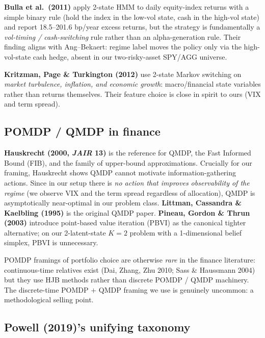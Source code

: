 \documentclass[11pt]{article}
\theoremstyle{plain1}
\theoremstyle{definition1}
\newcommand{\1}{\mathbf{1}}
\begin{document}
\textbf{Bulla et al.\ (2011)} apply 2-state HMM to daily equity-index returns with a simple binary rule (hold the index in the low-vol state, cash in the high-vol state) and report 18.5--201.6 bp/year excess returns, but the strategy is fundamentally a \emph{vol-timing / cash-switching} rule rather than an alpha-generation rule. Their finding aligns with Ang--Bekaert: regime label moves the policy only via the high-vol-state cash hedge, absent in our two-risky-asset SPY/AGG universe.

\textbf{Kritzman, Page \& Turkington (2012)} use 2-state Markov switching on \emph{market turbulence, inflation, and economic growth}: macro/financial state variables rather than returns themselves. Their feature choice is close in spirit to ours (VIX and term spread).

\subsection{POMDP / QMDP in finance}

\textbf{Hauskrecht (2000, \emph{JAIR} 13)} is the reference for QMDP, the Fast Informed Bound (FIB), and the family of upper-bound approximations. Crucially for our framing, Hauskrecht shows QMDP cannot motivate information-gathering actions. Since in our setup there is \emph{no action that improves observability of the regime} (we observe VIX and the term spread regardless of allocation), QMDP is asymptotically near-optimal in our problem class. \textbf{Littman, Cassandra \& Kaelbling (1995)} is the original QMDP paper. \textbf{Pineau, Gordon \& Thrun (2003)} introduce point-based value iteration (PBVI) as the canonical tighter alternative; on our 2-latent-state $K{=}2$ problem with a 1-dimensional belief simplex, PBVI is unnecessary.

POMDP framings of portfolio choice are otherwise \emph{rare} in the finance literature: continuous-time relatives exist (Dai, Zhang, Zhu 2010; Sass \& Haussmann 2004) but they use HJB methods rather than discrete POMDP / QMDP machinery. The discrete-time POMDP $+$ QMDP framing we use is genuinely uncommon: a methodological selling point.

\subsection{Powell (2019)'s unifying taxonomy}\label{sec:powell}
\end{document}
